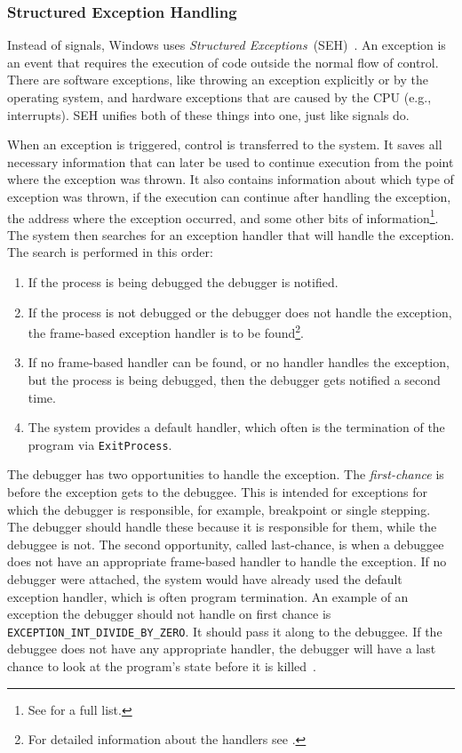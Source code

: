 \subsubsection*{Structured Exception Handling}
Instead of signals, Windows uses \textit{Structured
Exceptions}~(SEH)~\cite{windows-msdn-seh}. An exception is an event that
requires the execution of code outside the normal flow of control. There are
software exceptions, like throwing an exception explicitly or by the operating
system, and hardware exceptions that are caused by the CPU (e.g., interrupts).
SEH unifies both of these things into one, just like signals do.

When an exception is triggered, control is transferred to the system. It saves
all necessary information that can later be used to continue execution from the
point where the exception was thrown. It also contains information about which
type of exception was thrown, if the execution can continue after handling the
exception, the address where the exception occurred, and some other bits of
information\footnote{See \cite{windows-msdn-seh} for a full list.}. The system
then searches for an exception handler that will handle the exception. The
search is performed in this order:

\begin{enumerate}
    \item If the process is being debugged the debugger is notified.
    \item If the process is not debugged or the debugger does not handle the
        exception, the frame-based exception handler is to be
        found\footnote{For detailed information about the handlers see
        \cite{windows-msdn-seh}.}.
    \item If no frame-based handler can be found, or no handler handles the
        exception, but the process is being debugged, then the debugger gets
        notified a second time.
    \item The system provides a default handler, which often is the termination of
        the program via \texttt{ExitProcess}.
\end{enumerate}
The debugger has two opportunities to handle the exception. The
\textit{first-chance} is before the exception gets to the debuggee. This is
intended for exceptions for which the debugger is responsible, for example,
breakpoint or single stepping. The debugger should handle these because it is
responsible for them, while the debuggee is not. The second opportunity, called
last-chance, is when a debuggee does not have an appropriate frame-based
handler to handle the exception. If no debugger were attached, the system would
have already used the default exception handler, which is often program
termination. An example of an exception the debugger should not handle on first
chance is \verb|EXCEPTION_INT_DIVIDE_BY_ZERO|. It should pass it along to the
debuggee. If the debuggee does not have any appropriate handler, the debugger
will have a last chance to look at the program's state before it is
killed~\cite{windows-msdn-dbg-exc-handling}.

